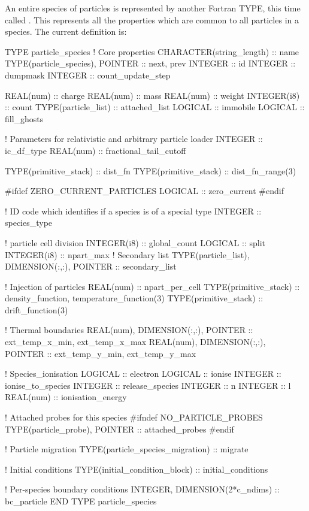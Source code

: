 An entire species of particles is represented by another Fortran TYPE, this
time called . This represents all the
properties which are common to all particles in a species.
The current definition is:
\begin{boxverbatim}
  TYPE particle_species
    ! Core properties
    CHARACTER(string_length) :: name
    TYPE(particle_species), POINTER :: next, prev
    INTEGER :: id
    INTEGER :: dumpmask
    INTEGER :: count_update_step

    REAL(num) :: charge
    REAL(num) :: mass
    REAL(num) :: weight
    INTEGER(i8) :: count
    TYPE(particle_list) :: attached_list
    LOGICAL :: immobile
    LOGICAL :: fill_ghosts

    ! Parameters for relativistic and arbitrary particle loader
    INTEGER :: ic_df_type
    REAL(num) :: fractional_tail_cutoff

    TYPE(primitive_stack) :: dist_fn
    TYPE(primitive_stack) :: dist_fn_range(3)

#ifdef ZERO_CURRENT_PARTICLES
    LOGICAL :: zero_current
#endif

    ! ID code which identifies if a species is of a special type
    INTEGER :: species_type

    ! particle cell division
    INTEGER(i8) :: global_count
    LOGICAL :: split
    INTEGER(i8) :: npart_max
    ! Secondary list
    TYPE(particle_list), DIMENSION(:,:), POINTER :: secondary_list

    ! Injection of particles
    REAL(num) :: npart_per_cell
    TYPE(primitive_stack) :: density_function, temperature_function(3)
    TYPE(primitive_stack) :: drift_function(3)

    ! Thermal boundaries
    REAL(num), DIMENSION(:,:), POINTER :: ext_temp_x_min, ext_temp_x_max
    REAL(num), DIMENSION(:,:), POINTER :: ext_temp_y_min, ext_temp_y_max

    ! Species_ionisation
    LOGICAL :: electron
    LOGICAL :: ionise
    INTEGER :: ionise_to_species
    INTEGER :: release_species
    INTEGER :: n
    INTEGER :: l
    REAL(num) :: ionisation_energy

    ! Attached probes for this species
#ifndef NO_PARTICLE_PROBES
    TYPE(particle_probe), POINTER :: attached_probes
#endif

    ! Particle migration
    TYPE(particle_species_migration) :: migrate

    ! Initial conditions
    TYPE(initial_condition_block) :: initial_conditions

    ! Per-species boundary conditions
    INTEGER, DIMENSION(2*c_ndims) :: bc_particle
  END TYPE particle_species
\end{boxverbatim}

